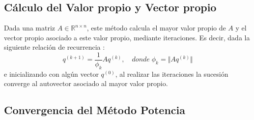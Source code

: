 \documentclass[12pt,a4paper]{article}
\begin{document}
\begin{multicols}{2}
\subsection{Cálculo del Valor propio y Vector propio}
\noindent Dada una matriz $A\in \mathbb{R}^{n\times n}$, este método calcula el mayor valor propio de $A$ y el vector propio asociado a este valor propio, mediante iteraciones.
Es decir, dada la siguiente relación de recurrencia :\begin{equation}
    q^{(k+1)} = \frac{1}{\phi_{k}}Aq^{(k)},\quad donde\;\phi_{k} = \Vert Aq^{(k)}\Vert    
\end{equation} e inicializando con algún vector $q^{(0)}$, al realizar las iteraciones la sucesión converge al autovector asociado al mayor valor propio.


\subsection{Convergencia del Método Potencia}%
\begin{itemize}
	
	

\end{itemize}
\end{multicols}
\end{document}
